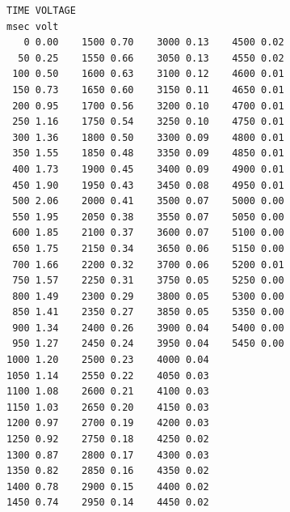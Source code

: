 \documentclass[parskip]{scrartcl}
\begin{document}
\newpage
\begin{verbatim}
TIME VOLTAGE
msec volt
   0 0.00    1500 0.70    3000 0.13    4500 0.02
  50 0.25    1550 0.66    3050 0.13    4550 0.02
 100 0.50    1600 0.63    3100 0.12    4600 0.01
 150 0.73    1650 0.60    3150 0.11    4650 0.01
 200 0.95    1700 0.56    3200 0.10    4700 0.01
 250 1.16    1750 0.54    3250 0.10    4750 0.01
 300 1.36    1800 0.50    3300 0.09    4800 0.01
 350 1.55    1850 0.48    3350 0.09    4850 0.01
 400 1.73    1900 0.45    3400 0.09    4900 0.01
 450 1.90    1950 0.43    3450 0.08    4950 0.01
 500 2.06    2000 0.41    3500 0.07    5000 0.00
 550 1.95    2050 0.38    3550 0.07    5050 0.00
 600 1.85    2100 0.37    3600 0.07    5100 0.00
 650 1.75    2150 0.34    3650 0.06    5150 0.00
 700 1.66    2200 0.32    3700 0.06    5200 0.01
 750 1.57    2250 0.31    3750 0.05    5250 0.00
 800 1.49    2300 0.29    3800 0.05    5300 0.00
 850 1.41    2350 0.27    3850 0.05    5350 0.00
 900 1.34    2400 0.26    3900 0.04    5400 0.00
 950 1.27    2450 0.24    3950 0.04    5450 0.00
1000 1.20    2500 0.23    4000 0.04    
1050 1.14    2550 0.22    4050 0.03    
1100 1.08    2600 0.21    4100 0.03    
1150 1.03    2650 0.20    4150 0.03    
1200 0.97    2700 0.19    4200 0.03    
1250 0.92    2750 0.18    4250 0.02    
1300 0.87    2800 0.17    4300 0.03    
1350 0.82    2850 0.16    4350 0.02    
1400 0.78    2900 0.15    4400 0.02    
1450 0.74    2950 0.14    4450 0.02    

\end{verbatim}
\end{document}
